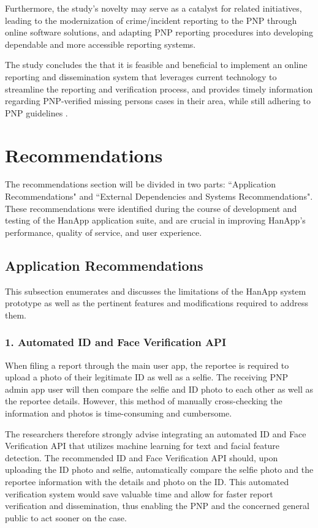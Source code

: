 Furthermore, the study's novelty may serve as a catalyst for related initiatives, leading to the modernization of crime/incident reporting to the PNP through online software solutions, and adapting PNP reporting procedures into developing dependable and more accessible reporting systems.

The study concludes the that it is feasible and beneficial to implement an online reporting and dissemination system that leverages current technology to streamline the reporting and verification process, and provides timely information regarding PNP-verified missing persons cases in their area, while still adhering to PNP guidelines .

\section{Recommendations}

The recommendations section will be divided in two parts: ``Application Recommendations" and ``External Dependencies and Systems Recommendations".  These recommendations were identified during the course of development and testing of the HanApp application suite, and are crucial in improving HanApp's performance, quality of service, and user experience.

\subsection{Application Recommendations}

This subsection enumerates and discusses the limitations of the HanApp system prototype as well as the pertinent features and modifications required to address them.

\subsubsection{1. Automated ID and Face Verification API}
When filing a report through the main user app, the reportee is required to upload a photo of their legitimate ID as well as a selfie. The receiving PNP admin app user will then compare the selfie and ID photo to each other as well as the reportee details. However, this method of manually cross-checking the information and photos is time-consuming and cumbersome. 

The researchers therefore strongly advise integrating an automated ID and Face Verification API that utilizes machine learning for text and facial feature detection. The recommended ID and Face Verification API should, upon uploading the ID photo and selfie, automatically compare the selfie photo and the reportee information with the details and photo on the ID. This automated verification system would save valuable time and allow for faster report verification and dissemination, thus enabling the PNP and the concerned general public to act sooner on the case.

